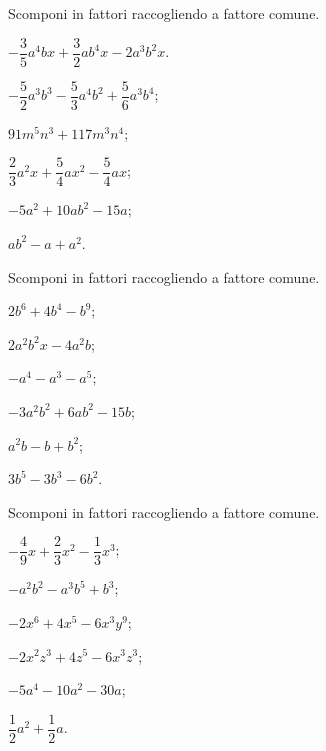 \begin{esercizio}
\label{ese:13.6}
Scomponi in fattori raccogliendo a fattore comune.
\begin{multicols}{2}
\begin{enumeratea}
 \item $-{\dfrac{3}{5}}a^{4}bx+\dfrac{3}{2}ab^{4}x-2a^{3}b^{2}x$.
 \item $-{\dfrac{5}{2}}a^{3}b^{3}-\dfrac{5}{3}a^{4}b^{2}+\dfrac{5}{6}a^{3}b^{4}$;
 \item $91m^{5}n^{3}+117m^{3}n^{4}$;
 \item $\dfrac{2}{3}a^{2}x+\dfrac{5}{4}ax^{2}-\dfrac{5}{4}ax$;
 \item $-5a^{2}+10ab^{2}-15a$;
 \item $ab^{2}-a+a^{2}$.
\end{enumeratea}
\end{multicols}
\end{esercizio}
\pagebreak
\begin{esercizio}
\label{ese:13.7}
Scomponi in fattori raccogliendo a fattore comune.
\begin{multicols}{3}
\begin{enumeratea}
 \item $2b^{6}+4b^{4}-b^{9}$;
 \item $2a^{2}b^{2}x-4a^{2}b$;
 \item $-a^{4}-a^{3}-a^{5}$;
 \item $-3a^{2}b^{2}+6ab^{2}-15b$;
 \item $a^{2}b-b+b^{2}$;
 \item $3b^{5}-3b^{3}-6b^{2}$.
\end{enumeratea}
\end{multicols}
\end{esercizio}

\begin{esercizio}
\label{ese:13.8}
Scomponi in fattori raccogliendo a fattore comune.
\begin{multicols}{3}
\begin{enumeratea}
 \item $-{\dfrac{4}{9}}x+\dfrac{2}{3}x^{2}-\dfrac{1}{3}x^{3}$;
 \item $-a^{2}b^{2}-a^{3}b^{5}+b^{3}$;
 \item $-2x^{6}+4x^{5}-6x^{3}y^{9}$;
 \item $-2x^{2}z^{3}+4z^{5}-6x^{3}z^{3}$;
 \item $-5a^{4}-10a^{2}-30a$;
 \item $\dfrac{1}{2}a^{2}+\dfrac{1}{2}a$.
\end{enumeratea}
\end{multicols}
\end{esercizio}

